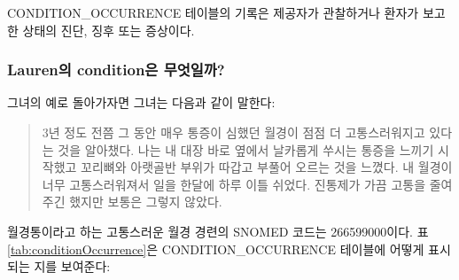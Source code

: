 \documentclass[11pt]{book}
\theoremstyle{definition}
\theoremstyle{definition}
\theoremstyle{definition}
\theoremstyle{remark}
\begin{document}
CONDITION\_OCCURRENCE 테이블의 기록은 제공자가 관찰하거나 환자가 보고한
상태의 진단, 징후 또는 증상이다.

\subsubsection*{Lauren의 condition은 무엇일까?}\label{lauren-condition-}

그녀의 예로 돌아가자면 그녀는 다음과 같이 말한다:

\begin{quote}
3년 정도 전쯤 그 동안 매우 통증이 심했던 월경이 점점 더 고통스러워지고
있다는 것을 알아챘다. 나는 내 대장 바로 옆에서 날카롭게 쑤시는 통증을
느끼기 시작했고 꼬리뼈와 아랫골반 부위가 따갑고 부풀어 오르는 것을
느꼈다. 내 월경이 너무 고통스러워져서 일을 한달에 하루 이틀 쉬었다.
진통제가 가끔 고통을 줄여 주긴 했지만 보통은 그렇지 않았다.
\end{quote}

월경통이라고 하는 고통스러운 월경 경련의 SNOMED 코드는 266599000이다. 표
\ref{tab:conditionOccurrence}은 CONDITION\_OCCURRENCE 테이블에 어떻게
표시되는 지를 보여준다:
\end{document}
